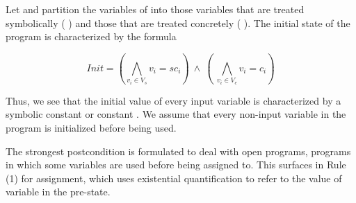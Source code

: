 \documentclass{IOS-Book-Article}
\begin{document}
\begin{mdP}[class={indent,para-continue},data-line={511}]%
{}Let %
{}%
{} and %
{}%
{} partition the variables of %
{}%
{} into those variables
that are treated symbolically (%
{}%
{}) and those that are treated concretely 
(%
{}%
{}). The initial state of the program is characterized by the formula%
\end{mdP}%
\begin{mdDiv}[class={equation,para-block},label={[(1)]\{.equation-label\}},elem={equation},line-adjust={0},data-line={515}]%
{}%
{}
\begin{mdDiv}[class={mathdisplay,para-block,input-math},elem={mathdisplay},color={},math-needpdf={},line-adjust={0},data-line={516}]%
\begin{mdDiv}[class={math-display}]%
\[%
Init = (\bigwedge_{v_i \in V_s} v_i = sc_i) ~\wedge~ (~\bigwedge_{v_i \in V_c} v_i = c_i)
\]%
\end{mdDiv}%
\end{mdDiv}%
\end{mdDiv}%
\begin{mdP}[data-line={519}]%
{}Thus, we see that the initial value of every input variable is characterized by 
a symbolic constant %
{}%
{} or constant %
{}%
{}.  We assume that every non-input
variable in the program is initialized before being used.%
\end{mdP}%
\begin{mdP}[class={indent},data-line={523}]%
{}The strongest postcondition is formulated to deal with open programs,
programs in which some variables are used before being assigned to. 
This surfaces in Rule (1) for assignment, which uses existential quantification
to refer to the value of variable %
{}%
{} in the pre-state.%
\end{mdP}%
\end{document}
